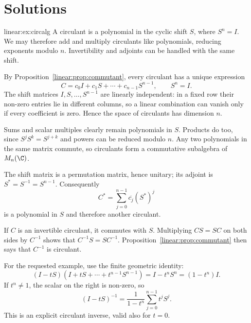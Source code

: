 \section{Solutions}

\begin{solution}{linear:ex:circalg}
\idea A circulant is a polynomial in the cyclic shift $S$, where $S^n=I$. We may therefore add and multiply circulants like polynomials, reducing exponents modulo $n$. Invertibility and adjoints can be handled with the same shift.

\writeup By Proposition~\ref{linear:prop:commutant}, every circulant has a unique expression
\[
C=c_0I+c_1S+\cdots+c_{n-1}S^{n-1},
\qquad S^n=I.
\]
The shift matrices $I,S,\ldots,S^{n-1}$ are linearly independent: in a fixed row their non-zero entries lie in different columns, so a linear combination can vanish only if every coefficient is zero. Hence the space of circulants has dimension $n$.

Sums and scalar multiples clearly remain polynomials in $S$. Products do too, since $S^jS^k=S^{j+k}$ and powers can be reduced modulo $n$. Any two polynomials in the same matrix commute, so circulants form a commutative subalgebra of $M_n(\C)$.

The shift matrix is a permutation matrix, hence unitary; its adjoint is $S^*=S^{-1}=S^{n-1}$. Consequently
\[
C^*=\sum_{j=0}^{n-1}\overline{c_j}(S^*)^j
\]
is a polynomial in $S$ and therefore another circulant.

If $C$ is an invertible circulant, it commutes with $S$. Multiplying $CS=SC$ on both sides by $C^{-1}$ shows that $C^{-1}S=SC^{-1}$. Proposition~\ref{linear:prop:commutant} then says that $C^{-1}$ is circulant.

For the requested example, use the finite geometric identity:
\[
(I-tS)(I+tS+\cdots+t^{n-1}S^{n-1})
=I-t^nS^n=(1-t^n)I.
\]
If $t^n\ne1$, the scalar on the right is non-zero, so
\[
\boxed{(I-tS)^{-1}=\frac1{1-t^n}
\sum_{j=0}^{n-1}t^jS^j}.
\]
This is an explicit circulant inverse, valid also for $t=0$.
\end{solution}


